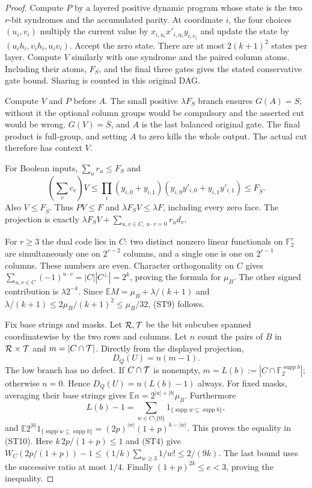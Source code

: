 \documentclass[11pt]{article}
\newcommand{\E}{\mathbb E}
\begin{document}
\begin{proof}
Compute $P$ by a layered positive dynamic program whose state is
the two $r$-bit syndromes and the accumulated parity.
At coordinate $i$, the four choices $(u_i,v_i)$ multiply the
current value by $x_{i,u_i}x'_{i,u_i}y_{i,v_i}$ and update the
state by $(u_i h_i,v_i h_i,u_iv_i)$.
Accept the zero state. There are at most $2(k+1)^2$ states per layer.
Compute $V$ similarly with one syndrome and the paired column atoms.
Including their atoms, $F_S$, and the final three gates gives the
stated conservative gate bound. Sharing is counted in this original DAG.

Compute $V$ and $P$ before $A$. The small positive $\lambda F_S$
branch ensures $G(A)=S$; without it the optional column groups
would be compulsory and the asserted cut would be wrong.
$G(V)=\overline S$, and $A$ is the last balanced original gate.
The final product is full-group, and setting $A$ to zero kills
the whole output. The actual cut therefore has context $V$.

For Boolean inputs,
$\sum_u r_u\le F_S$ and
\[
 \left(\sum_v c_v\right)V
 \le\prod_i(y_{i,0}+y_{i,1})
               (y_{i,0}y'_{i,0}+y_{i,1}y'_{i,1})
 \le F_{\overline S}.
\]
Also $V\le F_{\overline S}$. Thus $PV\le F$ and
$\lambda F_SV\le\lambda F$, including every zero face.
The projection is exactly
$\lambda F_SV+\sum_{u,v\in C,\ u\cdot v=0}r_ud_v$.

For $r\ge3$ the dual code lies in $C$:
two distinct nonzero linear functionals on $\mathbb F_2^r$
are simultaneously one on $2^{r-2}$ columns, and a single one
is one on $2^{r-1}$ columns. These numbers are even.
Character orthogonality on $C$ gives
$\sum_{u,v\in C}(-1)^{u\cdot v}=|C||C^\perp|=2^k$,
proving the formula for $\mu_B$.
The other signed contribution is $\lambda2^{-k}$.
Since $\E M=\mu_B+\lambda/(k+1)$ and
$\lambda/(k+1)\le2\mu_B/(k+1)^2\le\mu_B/32$,
(ST9) follows.

Fix base strings and masks. Let ${\cal R},{\cal T}$ be the bit
subcubes spanned coordinatewise by the two rows and columns.
Let $n$ count the pairs of $B$ in ${\cal R}\times{\cal T}$ and
$m=|C\cap{\cal T}|$. Directly from the displayed projection,
\[
                         D_Q(U)=n(m-1).
\]
The low branch has no defect. If $C\cap{\cal T}$ is nonempty,
$m=L(b):=|C\cap\mathbb F_2^{\operatorname{supp}b}|$;
otherwise $n=0$. Hence $D_Q(U)=n(L(b)-1)$ always.
For fixed masks, averaging their base strings gives
$\E n=2^{|a|+|b|}\mu_B$.
Furthermore
\[
 L(b)-1=\sum_{w\in C\setminus\{0\}}
                 1_{\{\operatorname{supp}w\subseteq\operatorname{supp}b\}},
\]
and
$\E 2^{|b|}1_{\{\operatorname{supp}w\subseteq\operatorname{supp}b\}}
=(2p)^{|w|}(1+p)^{k-|w|}$.
This proves the equality in (ST10).
Here $k\,2p/(1+p)\le1$ and (ST4) give
$W_C(2p/(1+p))-1\le(1/k)\sum_{w\ge3}1/w!\le2/(9k)$.
The last bound uses the successive ratio at most $1/4$.
Finally $(1+p)^{2k}\le e<3$, proving the inequality.
\end{proof}
\end{document}
